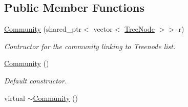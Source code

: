 \subsection*{Public Member Functions}
\begin{DoxyCompactItemize}
\item 
\hyperlink{class_community_a737aa42295cc6122cb76a1f16ffd1966}{Community} (shared\+\_\+ptr$<$ vector$<$ \hyperlink{class_tree_node}{Tree\+Node} $>$$>$ r)
\begin{DoxyCompactList}\small\item\em Contructor for the community linking to Treenode list. \end{DoxyCompactList}\item 
\hyperlink{class_community_a995bd6adbfb7a4aad1bc5fb74e2a8ef2}{Community} ()\hypertarget{class_community_a995bd6adbfb7a4aad1bc5fb74e2a8ef2}{}\label{class_community_a995bd6adbfb7a4aad1bc5fb74e2a8ef2}

\begin{DoxyCompactList}\small\item\em Default constructor. \end{DoxyCompactList}\item 
virtual \hyperlink{class_community_ac20910659d928af0dc4f7027bfece25c}{$\sim$\+Community} ()\hypertarget{class_community_ac20910659d928af0dc4f7027bfece25c}{}\label{class_community_ac20910659d928af0dc4f7027bfece25c}


\end{DoxyCompactItemize}
